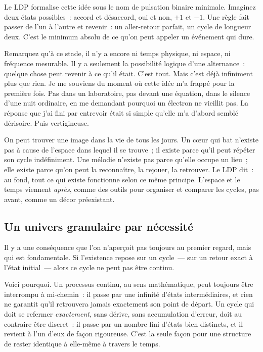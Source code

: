 \documentclass[12pt, a4paper, openright]{book}
\begin{document}
Le LDP formalise cette idée sous le nom de pulsation binaire minimale. Imaginez deux états possibles~: accord et désaccord, oui et non, $+1$ et $-1$. Une règle fait passer de l'un à l'autre et revenir~: un aller-retour parfait, un cycle de longueur deux. C'est le minimum absolu de ce qu'on peut appeler un événement qui dure.

\medskip

Remarquez qu'à ce stade, il n'y a encore ni temps physique, ni espace, ni fréquence mesurable. Il y a seulement la possibilité logique d'une alternance~: quelque chose peut revenir à ce qu'il était. C'est tout. Mais c'est déjà infiniment plus que rien. Je me souviens du moment où cette idée m'a frappé pour la première fois. Pas dans un laboratoire, pas devant une équation, dans le silence d'une nuit ordinaire, en me demandant pourquoi un électron ne vieillit pas. La réponse que j'ai fini par entrevoir était si simple qu'elle m'a d'abord semblé dérisoire. Puis vertigineuse.

\medskip

On peut trouver une image dans la vie de tous les jours. Un c\oe{}ur qui bat n'existe pas à cause de l'espace dans lequel il se trouve~; il existe parce qu'il peut répéter son cycle indéfiniment. Une mélodie n'existe pas parce qu'elle occupe un lieu~; elle existe parce qu'on peut la reconnaître, la rejouer, la retrouver. Le LDP dit~: au fond, tout ce qui existe fonctionne selon ce même principe. L'espace et le temps viennent \emph{après}, comme des outils pour organiser et comparer les cycles, pas avant, comme un décor préexistant.

\subsection*{Un univers granulaire par nécessité}

Il y a une conséquence que l'on n'aperçoit pas toujours au premier regard, mais qui est fondamentale. Si l'existence repose sur un cycle~--- sur un retour exact à l'état initial~--- alors ce cycle ne peut pas être continu.

\medskip

Voici pourquoi. Un processus continu, au sens mathématique, peut toujours être interrompu à mi-chemin~: il passe par une infinité d'états intermédiaires, et rien ne garantit qu'il retrouvera jamais exactement son point de départ. Un cycle qui doit se refermer \emph{exactement}, sans dérive, sans accumulation d'erreur, doit au contraire être discret~: il passe par un nombre fini d'états bien distincts, et il revient à l'un d'eux de façon rigoureuse. C'est la seule façon pour une structure de rester identique à elle-même à travers le temps.
\end{document}
